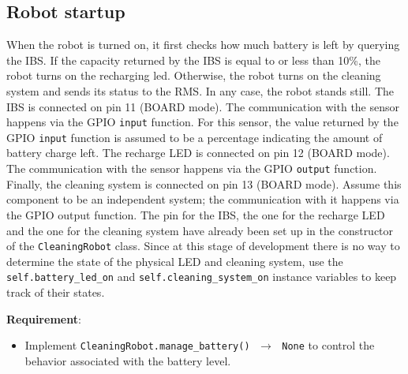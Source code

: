 \subsection{Robot startup}
When the robot is turned on, it first checks how much battery is left by querying the IBS. If the capacity returned by the IBS is equal to or less than 10\%, the robot turns on the recharging led. Otherwise, the robot turns on the cleaning system and sends its status to the RMS. In any case, the robot stands still.
The IBS is connected on pin 11 (BOARD mode). The communication with the sensor happens via the GPIO \texttt{input} function. For this sensor, the value returned by the GPIO \texttt{input} function is assumed to be a percentage indicating the amount of battery charge left. 
The recharge LED is connected on pin 12 (BOARD mode). The communication with the sensor happens via the GPIO \texttt{output} function.
Finally, the cleaning system is connected on pin 13 (BOARD mode). Assume this component to be an independent system; the communication with it happens via the GPIO output function.
The pin for the IBS, the one for the recharge LED and the one for the cleaning system have already been set up in the constructor of the \texttt{CleaningRobot} class.
Since at this stage of development there is no way to determine the state of the physical LED and cleaning system, use the \texttt{self.battery\_led\_on} and \texttt{self.cleaning\_system\_on} instance variables to keep track of their states.

\noindent\textbf{Requirement}:
\begin{itemize}
    \item Implement \texttt{CleaningRobot.manage\_battery() $\,\to\,$ None} to control the behavior associated with the battery level.
\end{itemize}



